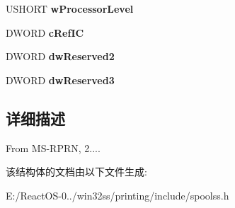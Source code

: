\begin{DoxyCompactItemize}
\mbox{\label{struct___p_r_i_n_t_e_r___i_n_f_o___s_t_r_e_s_s_a7fab9c903cd1db143c33611518570898}} 
U\+S\+H\+O\+RT {\bfseries w\+Processor\+Level}
\item 
\mbox{\label{struct___p_r_i_n_t_e_r___i_n_f_o___s_t_r_e_s_s_a3c75397da3e162bde9211341bb576d48}} 
D\+W\+O\+RD {\bfseries c\+Ref\+IC}
\item 
\mbox{\label{struct___p_r_i_n_t_e_r___i_n_f_o___s_t_r_e_s_s_ab397e97a8a3d4a7dac2023de1e442d1c}} 
D\+W\+O\+RD {\bfseries dw\+Reserved2}
\item 
\mbox{\label{struct___p_r_i_n_t_e_r___i_n_f_o___s_t_r_e_s_s_a8569b566edf9fd8dbd575af9ac2a91f9}} 
D\+W\+O\+RD {\bfseries dw\+Reserved3}
\end{DoxyCompactItemize}


\subsection{详细描述}
From M\+S-\/\+R\+P\+RN, 2.... 

该结构体的文档由以下文件生成\+:\begin{DoxyCompactItemize}
\item 
E\+:/\+React\+O\+S-\/0../win32ss/printing/include/spoolss.\+h\end{DoxyCompactItemize}
